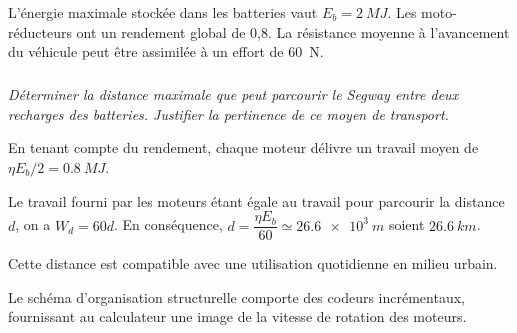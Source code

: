 \documentclass[10pt,fleqn]{article} %
\begin{document}
L’énergie maximale stockée dans les batteries vaut $E_b = \SI{2}{MJ}$. Les moto-réducteurs ont un rendement global de 0,8. La résistance moyenne à l’avancement du véhicule peut être assimilée à un effort de \SI{60}{N}.
\fi 
\subparagraph{\label{q_01}}\textit{Déterminer la distance maximale que peut parcourir le Segway entre deux recharges des batteries. Justifier la pertinence de ce moyen de transport.}
\ifprof
\begin{corrige}

En tenant compte du rendement, chaque moteur délivre un travail moyen de $\eta E_b/2 = \SI{0,8}{MJ}$.

Le travail fourni par les moteurs étant égale au travail pour parcourir la distance $d$, on a $W_{d}=60d$. 
En conséquence, $d = \dfrac{\eta E_b}{60} \simeq \SI{26,6e3}{m}$ soient $\SI{26,6}{km}$.

Cette distance est compatible avec une utilisation quotidienne en milieu urbain.
\end{corrige}
\else
\fi
 
 \ifprof
 \else
Le schéma d’organisation structurelle comporte des codeurs incrémentaux, fournissant au calculateur une image de la vitesse de rotation des moteurs.
\fi
\end{document}
